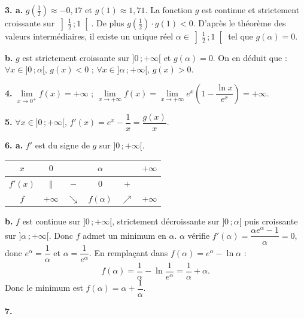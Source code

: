 \documentclass[11pt]{article}
\begin{document}
\textbf{3. a.} $g\!\left(\tfrac{1}{2}\right) \approx -0{,}17$ et $g(1) \approx 1{,}71$. La fonction $g$ est continue et strictement croissante sur $\left]\tfrac{1}{2}\,;1\right[$. De plus $g\!\left(\tfrac{1}{2}\right) \cdot g(1) < 0$. D'après le théorème des valeurs intermédiaires, il existe un unique réel $\alpha \in \left]\tfrac{1}{2}\,;1\right[$ tel que $g(\alpha) = 0$.

\textbf{b.} $g$ est strictement croissante sur $]0\,;+\infty[$ et $g(\alpha) = 0$. On en déduit que : $\forall x \in ]0\,;\alpha[$, $g(x) < 0$ ; $\forall x \in ]\alpha\,;+\infty[$, $g(x) > 0$.

\textbf{4.} $\lim\limits_{x\to 0^+} f(x) = +\infty$ ; $\lim\limits_{x\to+\infty} f(x) = \lim\limits_{x\to+\infty} e^x\left(1 - \dfrac{\ln x}{e^x}\right) = +\infty$.

\textbf{5.} $\forall x \in ]0\,;+\infty[$, $f'(x) = e^x - \dfrac{1}{x} = \dfrac{g(x)}{x}$.

\textbf{6. a.} $f'$ est du signe de $g$ sur $]0\,;+\infty[$.
\begin{center}\renewcommand{\arraystretch}{1.4}
\begin{tabular}{|c|ccccc|}
\hline
$x$ & $0$ & & $\alpha$ & & $+\infty$ \\
\hline
$f'(x)$ & $\|$ & $-$ & $0$ & $+$ & \\
\hline
$f$ & $+\infty$ & $\searrow$ & $f(\alpha)$ & $\nearrow$ & $+\infty$ \\
\hline
\end{tabular}
\end{center}

\textbf{b.} $f$ est continue sur $]0\,;+\infty[$, strictement décroissante sur $]0\,;\alpha[$ puis croissante sur $]\alpha\,;+\infty[$. Donc $f$ admet un minimum en $\alpha$. $\alpha$ vérifie $f'(\alpha) = \dfrac{\alpha e^\alpha - 1}{\alpha} = 0$, donc $e^\alpha = \dfrac{1}{\alpha}$ et $\alpha = \dfrac{1}{e^\alpha}$. En remplaçant dans $f(\alpha) = e^\alpha - \ln\alpha$ :
\[ f(\alpha) = \frac{1}{\alpha} - \ln\frac{1}{e^\alpha} = \frac{1}{\alpha} + \alpha. \]
Donc le minimum est $f(\alpha) = \alpha + \dfrac{1}{\alpha}$.

\textbf{7.} \begin{center}
\end{center}
\end{document}
